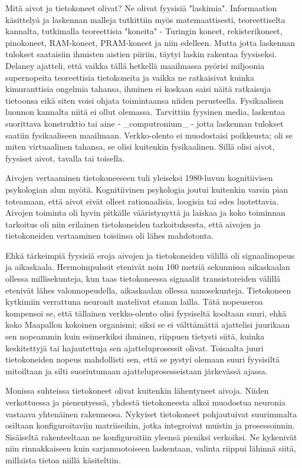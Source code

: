 Mitä aivot ja tietokoneet olivat? Ne olivat fyysisiä "laskimia". Informaation käsittelyä ja laskennan malleja tutkittiin myös matemaattisesti, teoreettiselta kannalta, tutkimalla teoreettisia "koneita" - Turingin koneet, rekisterikoneet, pinokoneet, RAM-koneet, PRAM-koneet ja niin edelleen. Mutta jotta laskennan tulokset saataisiin ihmisten aistien piiriin, täytyi laskin rakentaa fyysiseksi. Delaney ajatteli, että vaikka tällä hetkellä maailmassa pyörisi miljoonia supernopeita teoreettisia tietokoneita ja vaikka ne ratkaisivat kuinka kimuranttisia ongelmia tahansa, ihminen ei koskaan saisi näitä ratkaisuja tietoonsa eikä siten voisi ohjata toimintaansa niiden perusteella. Fysikaalisen luonnon kannalta niitä ei ollut olemassa. Tarvittiin fyysinen media, laskentaa suorittava konstruktio tai aine - _computronium_ - jotta laskennan tulokset saatiin fysikaaliseen maailmaan. Verkko-olento ei muodostaisi poikkeusta; oli se miten virtuaalinen tahansa, se olisi kuitenkin fysikaalinen. Sillä olisi aivot, fyysiset aivot, tavalla tai toisella.


Aivojen vertaaminen tietokoneeseen tuli yleiseksi 1980-luvun kognitiivisen psykologian alun myötä. Kognitiivinen psykologia joutui kuitenkin varsin pian toteamaan, että aivot eivät olleet rationaalisia, loogisia tai edes luotettavia. Aivojen toiminta oli hyvin pitkälle vääristynyttä ja laiskaa ja koko toiminnan tarkoitus oli niin erilainen tietokoneiden tarkoituksesta, että aivojen ja tietokoneiden vertaaminen toisiinsa oli lähes mahdotonta.


Ehkä tärkeimpiä fyysisiä eroja aivojen ja tietokoneiden välillä oli signaalinopeus ja aikaskaala. Hermoimpulssit etenivät noin 100 metriä sekunnissa aikaskaalan ollessa millisekunteja, kun taas tietokoneessa signaalit transistoreiden välillä etenivät lähes valonnopeudella, aikaskaalan ollessa nanosekunteja. Tietokoneen kytkimiin verrattuna neuronit matelivat etanan lailla. Tätä nopeuseroa kompensoi se, että tällainen verkko-olento olisi fyysiseltä kooltaan suuri, ehkä koko Maapallon kokoinen organismi; siksi se ei välttämättä ajattelisi juurikaan sen nopeammin kuin esimerkiksi ihminen, riippuen tietysti siitä, kuinka keskitettyjä tai hajautettuja sen ajatteluprosessit olivat. Toisaalta juuri tietokoneiden nopeus mahdollisti sen, että se pystyi olemaan suuri fyysisiltä mitoiltaan ja silti suoriutumaan ajatteluprosesseistaan järkevässä ajassa.


Monissa suhteissa tietokoneet olivat kuitenkin lähentyneet aivoja. Niiden verkottuessa ja pienentyessä, yhdestä tietokoneesta alkoi muodostua neuronia vastaava yhtenäinen rakenneosa. Nykyiset tietokoneet pohjautuivat suurimmalta osiltaan konfiguroitaviin matriiseihin, jotka integroivat muistin ja prosessoinnin. Sisäiseltä rakenteeltaan ne konfiguroitiin yleensä pieniksi verkoiksi. Ne kykenivät niin rinnakkaiseen kuin sarjamuotoiseen laskentaan, valinta riippui lähinnä siitä, millaista tietoa niillä käsiteltiin.


